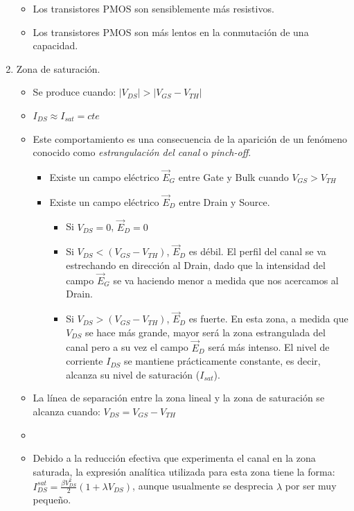 \documentclass[oneside]{book}
\numberwithin{equation}{section}
\numberwithin{figure}{section}
\numberwithin{table}{section}
\begin{document}
\begin{enumerate}
\begin{itemize}
							\item Los transistores PMOS son sensiblemente más resistivos.
							\item Los transistores PMOS son más lentos en la conmutación de una capacidad.
						\end{itemize}
					\item Zona de saturación.
						\begin{itemize}
							\item Se produce cuando: $|V_{DS}|>|V_{GS}-V_{TH}|$
							\item $\displaystyle I_{DS} \approx I_{sat}=cte$
							\item Este comportamiento es una consecuencia de la aparición de un fenómeno conocido como \textit{estrangulación del canal} o \textit{pinch-off}.
							\begin{itemize}
								\item Existe un campo eléctrico $\vec{E}_G$ entre Gate y Bulk cuando $V_{GS}>V_{TH}$
								\item Existe un campo eléctrico $\vec{E}_D$ entre Drain y Source.
									\begin{itemize}
										\item Si $V_{DS}=0$, $\vec{E}_D=0$
										\item Si $V_{DS}<(V_{GS}-V_{TH})$, $\vec{E}_D$ es débil. El perfil del canal se va estrechando en dirección al Drain, dado que la intensidad del campo $\vec{E}_G$ se va haciendo menor a medida que nos acercamos al Drain.
										\item Si $V_{DS}>(V_{GS}-V_{TH})$, $\vec{E}_D$ es fuerte. En esta zona, a medida que $V_{DS}$ se hace más grande, mayor será la zona estrangulada del canal pero a su vez el campo $\vec{E}_D$ será más intenso. El nivel de corriente $I_{DS}$ se mantiene prácticamente constante, es decir, alcanza su nivel de saturación ($I_{sat}$).
									\end{itemize}
								\end{itemize}									
							\item La línea de separación entre la zona lineal y la zona de saturación se alcanza cuando: $V_{DS}=V_{GS}-V_{TH}$
							\item {}
							\item Debido a la reducción efectiva que experimenta el canal en la zona saturada, la expresión analítica utilizada para esta zona tiene la forma: $\displaystyle I_{DS}^{sat}=\frac{\beta V_{DS}^2}{2}(1+\lambda V_{DS})$, aunque usualmente se desprecia $\lambda$ por ser muy pequeño.

\end{itemize}
\end{enumerate}
\end{document}
